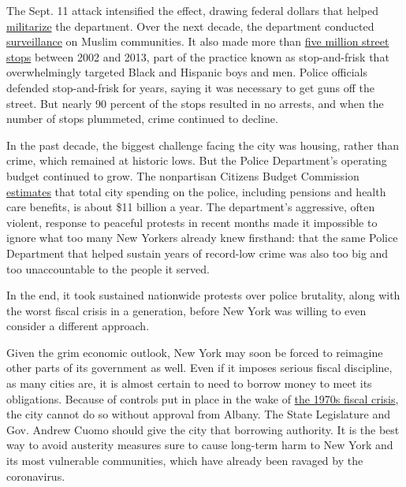 The Sept. 11 attack intensified the effect, drawing federal dollars that
helped
\href{https://www.nytimes3xbfgragh.onion/2011/12/05/nyregion/drone-submarines-add-eyes-for-nyc-harbor-police.html}{militarize}
the department. Over the next decade, the department conducted
\href{https://www.nytimes3xbfgragh.onion/2017/03/06/nyregion/nypd-spying-muslims-surveillance-lawsuit.html}{surveillance}
on Muslim communities. It also made more than
\href{https://www.nytimes3xbfgragh.onion/2019/11/17/nyregion/bloomberg-stop-and-frisk-new-york.html}{five
million street stops} between 2002 and 2013, part of the practice known
as stop-and-frisk that overwhelmingly targeted Black and Hispanic boys
and men. Police officials defended stop-and-frisk for years, saying it
was necessary to get guns off the street. But nearly 90 percent of the
stops resulted in no arrests, and when the number of stops plummeted,
crime continued to decline.

In the past decade, the biggest challenge facing the city was housing,
rather than crime, which remained at historic lows. But the Police
Department's operating budget continued to grow. The nonpartisan
Citizens Budget Commission
\href{https://cbcny.org/research/seven-facts-about-nypd-budget}{estimates}
that total city spending on the police, including pensions and health
care benefits, is about \$11 billion a year. The department's
aggressive, often violent, response to peaceful protests in recent
months made it impossible to ignore what too many New Yorkers already
knew firsthand: that the same Police Department that helped sustain
years of record-low crime was also too big and too unaccountable to the
people it served.

In the end, it took sustained nationwide protests over police brutality,
along with the worst fiscal crisis in a generation, before New York was
willing to even consider a different approach.

Given the grim economic outlook, New York may soon be forced to
reimagine other parts of its government as well. Even if it imposes
serious fiscal discipline, as many cities are, it is almost certain to
need to borrow money to meet its obligations. Because of controls put in
place in the wake of
\href{https://www.nytimes3xbfgragh.onion/2017/05/05/books/review/fear-city-new-york-fiscal-crisis-kim-phillips-fein.html}{the
1970s fiscal crisis}, the city cannot do so without approval from
Albany. The State Legislature and Gov. Andrew Cuomo should give the city
that borrowing authority. It is the best way to avoid austerity measures
sure to cause long-term harm to New York and its most vulnerable
communities, which have already been ravaged by the coronavirus.

